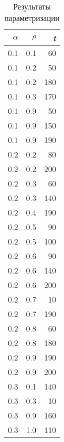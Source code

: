 \documentclass[a4paper,12pt]{article}
\begin{document}
\begin{table} [h!]
	\begin{center}
		\caption{Результаты параметризации}
		\begin{tabular}{|r|r|r|}
			\hline
			$\alpha$ &       $\rho$ & \textit{t} \\
			\hline
			0.1 &        0.1 &         60 \\
			\hline
			0.1 &        0.2 &         50 \\
			\hline
			0.1 &        0.2 &        180 \\
			\hline
			0.1 &        0.3 &        170 \\
			\hline
			0.1 &        0.9 &         50 \\
			\hline
			0.1 &        0.9 &        150 \\
			\hline
			0.1 &        0.9 &        190 \\
			\hline
			0.2 &        0.2 &         80 \\
			\hline
			0.2 &        0.2 &        200 \\
			\hline
			0.2 &        0.3 &         60 \\
			\hline
			0.2 &        0.3 &        140 \\
			\hline
			0.2 &        0.4 &        190 \\
			\hline
			0.2 &        0.5 &         90 \\
			\hline
			0.2 &        0.5 &        100 \\
			\hline
			0.2 &        0.6 &         90 \\
			\hline
			0.2 &        0.6 &        140 \\
			\hline
			0.2 &        0.6 &        200 \\
			\hline
			0.2 &        0.7 &         10 \\
			\hline
			0.2 &        0.7 &        190 \\
			\hline
			0.2 &        0.8 &         60 \\
			\hline
			0.2 &        0.8 &        180 \\
			\hline
			0.2 &        0.9 &        190 \\
			\hline
			0.2 &        0.9 &        200 \\
			\hline
			0.3 &        0.1 &        140 \\
			\hline
			0.3 &        0.3 &         10 \\
			\hline
			0.3 &        0.9 &        160 \\
			\hline
			0.3 &        1.0 &        110 \\

\end{tabular}
\end{center}
\end{table}
\end{document}
